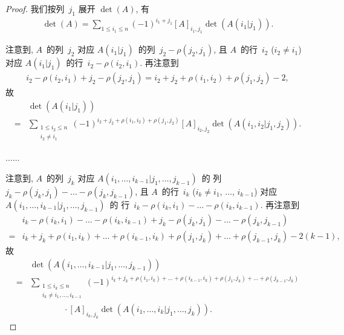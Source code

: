 \documentclass[%
    UTF8,%
    fontset=none,%
    punct=kaiming,%
    zihao=-4,%
    a4paper,%
    oneside,%
]{ctexbook}
\renewcommand*{\leq}{\leqslant}
\begin{document}
\begin{proof}
    我们按列~\(j_1\) 展开 \(\det {(A)}\),
    有
    \begin{align*}
        \det {(A)}
        = \sum_{1 \leq i_1 \leq n}
        {(-1)^{i_1 + j_1} [A]_{i_1,j_1} \det {(A(i_1|j_1))}}.
    \end{align*}

    注意到, \(A\)~的列~\(j_2\) 对应
    \(A(i_1|j_1)\)~的列~\(j_2 - \rho(j_2, j_1)\),
    且 \(A\)~的行~\(i_2\) (\(i_2 \neq i_1\)) 对应
    \(A(i_1|j_1)\)~的行~\(i_2 - \rho(i_2, i_1)\).
    再注意到
    \begin{align*}
        i_2 - \rho(i_2, i_1) + j_2 - \rho(j_2, j_1)
        = i_2 + j_2 + \rho(i_1, i_2) + \rho(j_1, j_2) - 2,
    \end{align*}
    故
    \begin{align*}
             &
        \det {(A(i_1|j_1))}
        \\
        = {} &
        \sum_{\substack{
        1 \leq i_2 \leq n \\
            i_2 \neq i_1
        }}
        {(-1)^{i_2 + j_2 + \rho(i_1, i_2) + \rho(j_1, j_2)}
            [A]_{i_2,j_2} \det {(A({i_1,i_2}|{j_1,j_2}))}}.
    \end{align*}

    \(\dots \dots\)

    注意到, \(A\)~的列~\(j_k\) 对应
    \(A({i_1,\dots,i_{k-1}}|{j_1,\dots,j_{k-1}})\)~的%
    列~\(j_k - \rho(j_k, j_1) - \dots - \rho(j_k, j_{k-1})\),
    且 \(A\)~的行~\(i_k\)
    (\(i_k \neq i_1\), \(\dots\), \(i_{k-1}\)) 对应
    \(A({i_1,\dots,i_{k-1}}|{j_1,\dots,j_{k-1}})\)~的%
    行~\(i_k - \rho(i_k, i_1) - \dots - \rho(i_k, i_{k-1})\).
    再注意到
    \begin{align*}
             &
        i_k - \rho(i_k, i_1) - \dots - \rho(i_k, i_{k-1})
        + j_k - \rho(j_k, j_1) - \dots - \rho(j_k, j_{k-1})
        \\
        = {} &
        i_k + j_k
        + \rho(i_1, i_k) + \dots + \rho(i_{k-1}, i_k)
        + \rho(j_1, j_k) + \dots + \rho(j_{k-1}, j_k)
        - 2(k-1),
    \end{align*}
    故
    \begin{align*}
             &
        \det {(A({i_1,\dots,i_{k-1}}|{j_1,\dots,j_{k-1}}))}
        \\
        = {} &
        \sum_{\substack{
        1 \leq i_k \leq n \\
                i_k \neq i_1, \dots, i_{k-1}
            }}
        {(-1)^{i_k + j_k
                    + \rho(i_1, i_k) + \dots + \rho(i_{k-1}, i_k)
                    + \rho(j_1, j_k) + \dots
                    + \rho(j_{k-1}, j_k)}}
        \\
             &
        \qquad \qquad
        \cdot
        [A]_{i_k,j_k}
        \det {(A({i_1,\dots,i_{k}}|{j_1,\dots,j_{k}}))}.
    \end{align*}


\end{proof}
\end{document}
